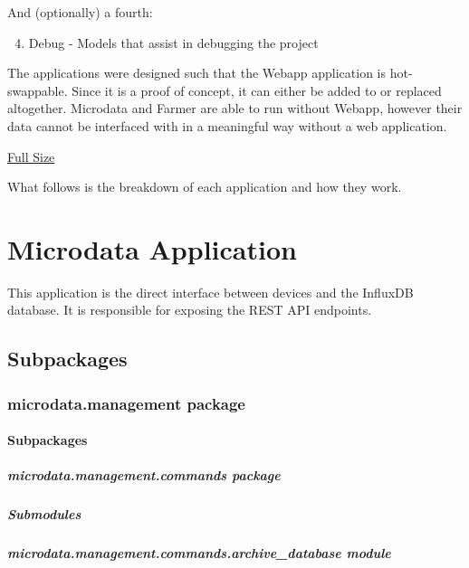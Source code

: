 \documentclass[letterpaper,10pt,english]{sphinxmanual}
\begin{document}
And (optionally) a fourth:
\begin{enumerate}
\setcounter{enumi}{3}
\item {} 
Debug - Models that assist in debugging the project

\end{enumerate}

The applications were designed such that the Webapp application is hot-swappable. Since it is a proof of concept, it can either be added to or replaced altogether. Microdata and Farmer are able to run without Webapp, however their data cannot be interfaced with in a meaningful way without a web application.

\href{http://i.imgur.com/uw3BtWt.png}{Full Size}

What follows is the breakdown of each application and how they work.


\section{Microdata Application}
\label{modules/microdata:microdata-application}\label{modules/microdata::doc}
This application is the direct interface between devices and the InfluxDB database. It is responsible for exposing the REST API endpoints.


\subsection{Subpackages}
\label{modules/microdata:subpackages}

\subsubsection{microdata.management package}
\label{modules/microdata.management:microdata-management-package}\label{modules/microdata.management::doc}

\paragraph{Subpackages}
\label{modules/microdata.management:subpackages}

\subparagraph{microdata.management.commands package}
\label{modules/microdata.management.commands::doc}\label{modules/microdata.management.commands:microdata-management-commands-package}

\subparagraph{Submodules}
\label{modules/microdata.management.commands:submodules}

\subparagraph{microdata.management.commands.archive\_database module}
\label{modules/microdata.management.commands:microdata-management-commands-archive-database-module}\label{modules/microdata.management.commands:module-microdata.management.commands.archive_database}
\end{document}
